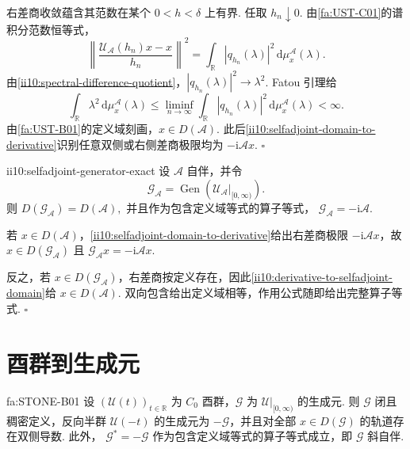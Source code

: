 \begin{FAProof}
右差商收敛蕴含其范数在某个 \(\displaystyle0<h<\delta\) 上有界. 任取 \(\displaystyle h_n\downarrow0\). 由\autoref{fa:UST-C01}的谱积分范数恒等式，
\[
\left\|
\frac{\mathcal U_{\mathcal A}(h_n)x-x}{h_n}
\right\|^2
=
\int_{\mathbb R}|q_{h_n}(\lambda)|^2
\,\mathrm{d}\mu_x^{\mathcal A}(\lambda).
\]
由\autoref{ii10:spectral-difference-quotient}，\(\displaystyle|q_{h_n}(\lambda)|^2\to\lambda^2\). Fatou 引理给
\[
\int_{\mathbb R}\lambda^2
\,\mathrm{d}\mu_x^{\mathcal A}(\lambda)
\leqslant
\liminf_{n\to\infty}
\int_{\mathbb R}|q_{h_n}(\lambda)|^2
\,\mathrm{d}\mu_x^{\mathcal A}(\lambda)
<\infty.
\]
由\autoref{fa:UST-B01}的定义域刻画，\(\displaystyle x\in D(\mathcal A)\). 此后\autoref{ii10:selfadjoint-domain-to-derivative}识别任意双侧或右侧差商极限均为 \(\displaystyle-\mathrm{i}\mathcal Ax\).
\hfill\(\square\)
\end{FAProof}

\begin{FATheorem}[B][自伴算子产生群的精确生成元]{ii10:selfadjoint-generator-exact}
设 \(\displaystyle\mathcal A\) 自伴，并令
\[
\mathcal G_{\mathcal A}
=
\operatorname{Gen}(\mathcal U_{\mathcal A}|_{[0,\infty)}).
\]
则 \(\displaystyle D(\mathcal G_{\mathcal A})=D(\mathcal A),\)
并且作为包含定义域等式的算子等式， \(\displaystyle \mathcal G_{\mathcal A}=-\mathrm{i}\mathcal A.\)
\end{FATheorem}

\begin{FAProof}
若 \(\displaystyle x\in D(\mathcal A)\)，\autoref{ii10:selfadjoint-domain-to-derivative}给出右差商极限 \(\displaystyle-\mathrm{i}\mathcal Ax\)，故 \(\displaystyle x\in D(\mathcal G_{\mathcal A})\) 且 \(\displaystyle\mathcal G_{\mathcal A}x=-\mathrm{i}\mathcal Ax\).

反之，若 \(\displaystyle x\in D(\mathcal G_{\mathcal A})\)，右差商按定义存在，因此\autoref{ii10:derivative-to-selfadjoint-domain}给 \(\displaystyle x\in D(\mathcal A)\). 双向包含给出定义域相等，作用公式随即给出完整算子等式.
\hfill\(\square\)
\end{FAProof}

\section{酉群到生成元}\label{sec:ii10-group-to-generator}

\begin{FATheorem}[B][酉群生成元的斜自伴性]{fa:STONE-B01}
设 \(\displaystyle(\mathcal U(t))_{t\in\mathbb R}\) 为 \(\displaystyle C_0\) 酉群，\(\displaystyle\mathcal G\) 为 \(\displaystyle\mathcal U|_{[0,\infty)}\) 的生成元. 则 \(\displaystyle\mathcal G\) 闭且稠密定义，反向半群 \(\displaystyle\mathcal U(-t)\) 的生成元为 \(\displaystyle-\mathcal G\)，并且对全部 \(\displaystyle x\in D(\mathcal G)\) 的轨道存在双侧导数. 此外， \(\displaystyle \mathcal G^*=-\mathcal G\)
作为包含定义域等式的算子等式成立，即 \(\displaystyle\mathcal G\) 斜自伴.
\end{FATheorem}


